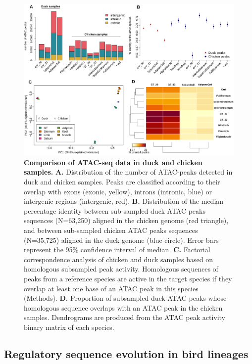 \begin{figure}[hbt!]
 \centering
 \includegraphics[width=1\textwidth, page=1] {figures/IPLOSS/new_figIPLOSS2.png}
 \caption[Comparison of ATAC-seq data in duck and chicken samples.]{
 \textbf{Comparison of ATAC-seq data in duck and chicken samples.}
 \textbf{A.} Distribution of the number of ATAC-peaks detected in duck and chicken samples. Peaks are classified according to their overlap with exons (exonic, yellow), introns (intronic, blue) or intergenic regions (intergenic, red). 
 \textbf{B.} Distribution of the median percentage identity between sub-sampled duck ATAC peaks sequences (N=63,250) aligned in the chicken genome (red triangle), and between sub-sampled chicken ATAC peaks sequences (N=35,725) aligned in the duck genome (blue circle). Error bars represent the 95\% confidence interval of median. 
 \textbf{C.} Factorial correspondence analysis of chicken and duck samples based on homologous subsampled peak activity. Homologous sequences of peaks from a reference species are active in the target species if they overlap at least one base of an ATAC peak in this species (Methods). \textbf{D.} Proportion of subsampled duck ATAC peaks whose homologous sequence overlaps with an ATAC peak in the chicken samples. Dendrograms are produced from the ATAC peak activity binary matrix of each species. \\
 }
 \label{fig:IPLOSS-fig4}
\end{figure} 

\subsection{Regulatory sequence evolution in bird lineages}

